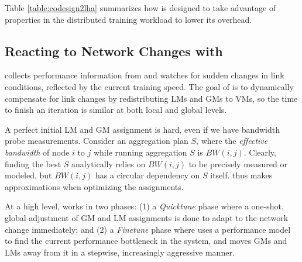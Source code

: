 Table \ref{table:codesign2lha} summarizes how \ha is designed to take advantage of properties in the distributed training workload to lower its overhead.

\subsection{Reacting to Network Changes with \autoplink}
\label{sec:autoplinkimpl}
\autoplink collects performance information from \ha and watches for sudden changes in link conditions, reflected by the current training speed. %
The goal of \autoplink is to dynamically compensate for link changes by redistributing LMs and GMs to VMs, so the time to finish an iteration is similar at both local and global levels.  %

A perfect initial LM and GM assignment is hard, even if we have bandwidth probe measurements. Consider an aggregation plan $S$, where the \textit{effective bandwidth} of node $i$ to $j$ while running aggregation $S$ is $BW(i,j)$.  Clearly, finding the best $S$ analytically relies on $BW(i,j)$ to be precisely measured or modeled, but $BW(i,j)$ has a circular dependency on $S$ itself. \autoplink thus makes approximations when optimizing the assignments. %

At a high level, \autoplink works in two phases: (1) a \textit{Quicktune} phase where a one-shot, global adjustment of GM and LM assignments is done to adapt to the network change immediately; and (2) a \textit{Finetune} phase where \autoplink uses a performance model to find the current performance bottleneck in the system, and moves GMs and LMs away from it in a stepwise, increasingly aggressive manner.

